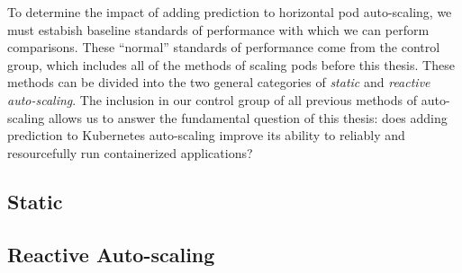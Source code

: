 To determine the impact of adding prediction to horizontal pod auto-scaling, we
must estabish baseline standards of performance with which we can perform comparisons.
These ``normal'' standards of performance come from the control group, which
includes all of the methods of scaling pods before this thesis. These methods
can be divided into the two general categories of \textit{static} and
\textit{reactive auto-scaling}. The inclusion in our control group of all
previous methods of auto-scaling allows us to answer the fundamental question of
this thesis: does adding prediction to Kubernetes auto-scaling improve its
ability to reliably and resourcefully run containerized applications?

\subsection{Static}



\subsection{Reactive Auto-scaling}


